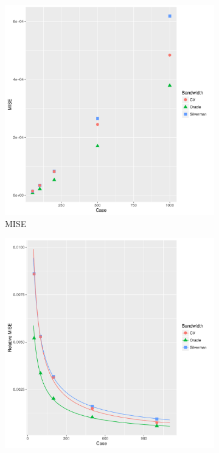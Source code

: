 \begin{figure}[htbp]
    \centering
    \begin{subfigure}[b]{0.3\textwidth}
    \includegraphics[width=\textwidth]{results/by_num_cases/MISE-vs-cases}
    \caption{MISE}
    \label{fig:ise:unif_NCases_1h:a}
    \end{subfigure}
    \begin{subfigure}[b]{0.3\textwidth}
    \includegraphics[width=\textwidth]{results/by_num_cases/RMISE-vs-cases}

\end{subfigure}
\end{figure}
